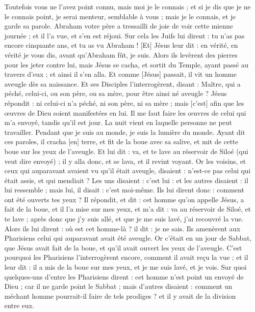 \begin{multicols}{2}
Toutefois vous ne l'avez point connu, mais moi je le connais ; et si je dis que je ne le connais point, je serai menteur, semblable à vous ; mais je le connais, et je garde sa parole.
Abraham votre père a tressailli de joie de voir cette mienne journée ; et il l'a vue, et s'en est réjoui.
Sur cela les Juifs lui dirent : tu n'as pas encore cinquante ans, et tu as vu Abraham !
[Et] Jésus leur dit : en vérité, en vérité je vous dis, avant qu'Abraham fût, je suis.
Alors ils levèrent des pierres pour les jeter contre lui, mais Jésus se cacha, et sortit du Temple, ayant passé au travers d'eux ; et ainsi il s'en alla.
\VerseOne{}Et comme [Jésus] passait, il vit un homme aveugle dès sa naissance.
Et ses Disciples l'interrogèrent, disant : Maître, qui a péché, celui-ci, ou son père, ou sa mère, pour être ainsi né aveugle ?
Jésus répondit : ni celui-ci n'a péché, ni son père, ni sa mère ; mais [c'est] afin que les œuvres de Dieu soient manifestées en lui.
Il me faut faire les œuvres de celui qui m'a envoyé, tandis qu'il est jour. La nuit vient en laquelle personne ne peut travailler.
Pendant que je suis au monde, je suis la lumière du monde.
Ayant dit ces paroles, il cracha [en] terre, et fit de la boue avec sa salive, et mit de cette boue sur les yeux de l'aveugle.
Et lui dit : va, et te lave au réservoir de Siloé (qui veut dire envoyé) ; il y alla donc, et se lava, et il revint voyant.
Or les voisins, et ceux qui auparavant avaient vu qu'il était aveugle, disaient : n'est-ce pas celui qui était assis, et qui mendiait ?
Les uns disaient : c'est lui : et les autres disaient : il lui ressemble ; mais lui, il disait : c'est moi-même.
Ils lui dirent donc : comment ont été ouverts tes yeux ?
Il répondit, et dit : cet homme qu'on appelle Jésus, a fait de la boue, et il l'a mise sur mes yeux, et m'a dit : va au réservoir de Siloé, et te lave ; après donc que j'y suis allé, et que je me suis lavé, j'ai recouvré la vue.
Alors ils lui dirent : où est cet homme-là ? il dit : je ne sais.
Ils amenèrent aux Pharisiens celui qui auparavant avait été aveugle.
Or c'était en un jour de Sabbat, que Jésus avait fait de la boue, et qu'il avait ouvert les yeux de l'aveugle.
C'est pourquoi les Pharisiens l'interrogèrent encore, comment il avait reçu la vue ; et il leur dit : il a mis de la boue sur mes yeux, et je me suis lavé, et je vois.
Sur quoi quelques-uns d'entre les Pharisiens dirent : cet homme n'est point un envoyé de Dieu ; car il ne garde point le Sabbat ; mais d'autres disaient : comment un méchant homme pourrait-il faire de tels prodiges ? et il y avait de la division entre eux.

\end{multicols}
